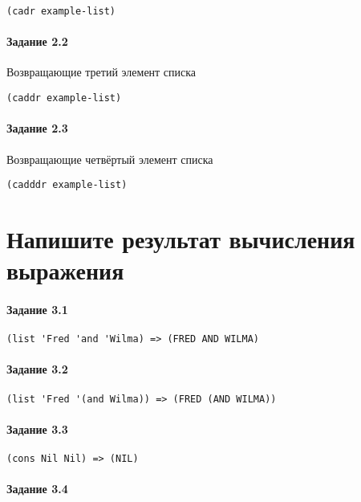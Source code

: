 \begin{lstlisting}
(cadr example-list)
\end{lstlisting}


\paragraph{Задание 2.2} Возвращающие третий элемент списка
\begin{lstlisting}
(caddr example-list)
\end{lstlisting}


\paragraph{Задание 2.3} Возвращающие четвёртый элемент списка
\begin{lstlisting}
(cadddr example-list)
\end{lstlisting}



\section{Напишите результат вычисления выражения}

\paragraph{Задание 3.1} \hfill

\begin{lstlisting}
(list 'Fred 'and 'Wilma) => (FRED AND WILMA)
\end{lstlisting}


\paragraph{Задание 3.2} \hfill

\begin{lstlisting}
(list 'Fred '(and Wilma)) => (FRED (AND WILMA))
\end{lstlisting}


\paragraph{Задание 3.3} \hfill

\begin{lstlisting}
(cons Nil Nil) => (NIL)
\end{lstlisting}


\paragraph{Задание 3.4} \hfill

